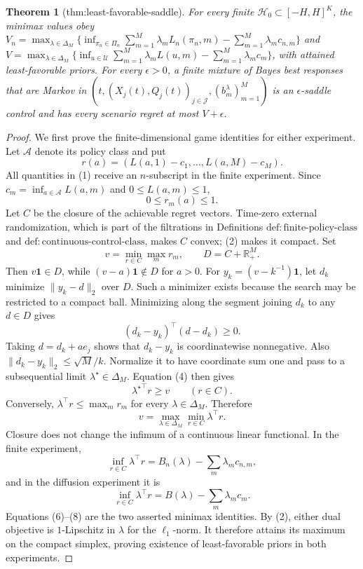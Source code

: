 \documentclass{article}
\newtheorem{theorem}{Theorem}
\begin{document}
\begin{theorem}[thm:least-favorable-saddle]\label{thm:least-favorable-saddle}
For every finite \(\mathcal H_0\subset[-H,H]^K\), the minimax values obey \(V_n=\max_{\lambda\in\Delta_M}\{\inf_{\pi_n\in\Pi_n}\sum_{m=1}^M\lambda_mL_n(\pi_n,m)-\sum_{m=1}^M\lambda_mc_{n,m}\}\) and \(V=\max_{\lambda\in\Delta_M}\{\inf_{u\in\mathcal U}\sum_{m=1}^M\lambda_mL(u,m)-\sum_{m=1}^M\lambda_mc_m\}\), with attained least-favorable priors. For every \(\epsilon>0\), a finite mixture of Bayes best responses that are Markov in \((t,(X_j(t),Q_j(t))_{j\in\mathcal J},(b_m^\lambda)_{m=1}^M)\) is an \(\epsilon\)-saddle control and has every scenario regret at most \(V+\epsilon\).
\end{theorem}
\begin{proof}
We first prove the finite-dimensional game identities for either experiment.  Let \(\mathcal A\) denote its policy class and put
\[
 r(a)=(L(a,1)-c_1,\ldots,L(a,M)-c_M).                             \tag{1}
\]
All quantities in (1) receive an \(n\)-subscript in the finite experiment.  Since \(c_m=\inf_{a\in\mathcal A}L(a,m)\) and \(0\leq L(a,m)\leq1\),
\[
 0\leq r_m(a)\leq1.                                             \tag{2}
\]
Let \(C\) be the closure of the achievable regret vectors.  Time-zero external randomization, which is part of the filtrations in Definitions \(\mathrm{def{:}finite\text{-}policy\text{-}class}\) and \(\mathrm{def{:}continuous\text{-}control\text{-}class}\), makes \(C\) convex; (2) makes it compact.  Set
\[
 v=\min_{r\in C}\max_mr_m,
 \qquad D=C+\mathbb R_+^M.                                      \tag{3}
\]
Then \(v\mathbf1\in D\), while \((v-a)\mathbf1\notin D\) for \(a>0\).  For \(y_k=(v-k^{-1})\mathbf1\), let \(d_k\) minimize \(\|y_k-d\|_2\) over \(D\).  Such a minimizer exists because the search may be restricted to a compact ball.  Minimizing along the segment joining \(d_k\) to any \(d\in D\) gives
\[
 (d_k-y_k)^\top(d-d_k)\geq0.                                   \tag{4}
\]
Taking \(d=d_k+ae_j\) shows that \(d_k-y_k\) is coordinatewise nonnegative.  Also \(\|d_k-y_k\|_2\leq\sqrt M/k\).  Normalize it to have coordinate sum one and pass to a subsequential limit \(\lambda^\star\in\Delta_M\).  Equation (4) then gives
\[
 {\lambda^\star}^{\!\top}r\geq v\qquad(r\in C).              \tag{5}
\]
Conversely, \(\lambda^\top r\leq\max_mr_m\) for every \(\lambda\in\Delta_M\).  Therefore
\[
 v=\max_{\lambda\in\Delta_M}\min_{r\in C}\lambda^\top r.   \tag{6}
\]
Closure does not change the infimum of a continuous linear functional.  In the finite experiment,
\[
 \inf_{r\in C}\lambda^\top r
 =B_n(\lambda)-\sum_m\lambda_mc_{n,m},                           \tag{7}
\]
and in the diffusion experiment it is
\[
 \inf_{r\in C}\lambda^\top r
 =B(\lambda)-\sum_m\lambda_mc_m.                                \tag{8}
\]
Equations (6)--(8) are the two asserted minimax identities.  By (2), either dual objective is \(1\)-Lipschitz in \(\lambda\) for the \(\ell_1\)-norm.  It therefore attains its maximum on the compact simplex, proving existence of least-favorable priors in both experiments.


\end{proof}
\end{document}
